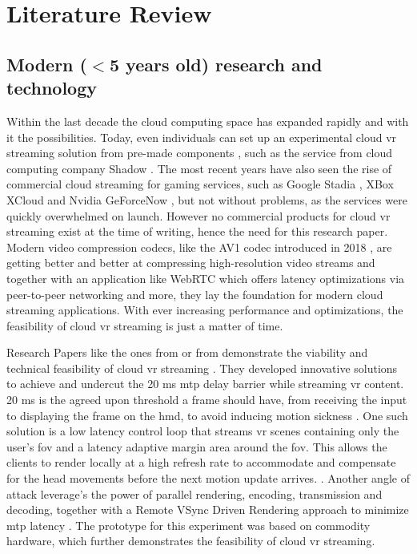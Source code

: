 \section{Literature Review}
\label{sec:lit}
\subsection{Modern ($<$5 years old) research and technology}

Within the last decade the cloud computing space has expanded rapidly and with it the possibilities. Today, even individuals can set up an experimental cloud \acrfull{vr} streaming solution from pre-made components \parencite{tayoexe}, such as the service from cloud computing company Shadow \parencite{shadow}. The most recent years have also seen the rise of commercial cloud streaming for gaming services, such as Google Stadia \parencite{stadia}, XBox XCloud \parencite{xcloud} and Nvidia GeForceNow \parencite{geforcenow}, but not without problems, as the services were quickly overwhelmed on launch. However no commercial products for cloud \acrshort{vr} streaming exist at the time of writing, hence the need for this research paper. Modern video compression codecs, like the AV1 codec introduced in 2018 \parencite{av1}, are getting better and better at compressing high-resolution video streams and together with an application like WebRTC \parencite{webRTC} which offers latency optimizations via peer-to-peer networking and more, they lay the foundation for modern cloud streaming applications. With ever increasing performance and optimizations, the feasibility of cloud \acrshort{vr} streaming is just a matter of time.

Research Papers like the ones from \cite{cutcord} or from \cite{mvr} demonstrate the viability and technical feasibility of cloud \acrshort{vr} streaming . They developed innovative solutions to achieve and undercut the 20 \acrfull{ms}  \acrfull{mtp} delay barrier while streaming \acrshort{vr} content. 20 \acrshort{ms} is the agreed upon threshold a frame should have, from receiving the input to displaying the frame on the \acrfull{hmd}, to avoid inducing motion sickness \parencite{valvevrlatency}. One such solution is a low latency control loop that streams \acrshort{vr} scenes containing only the user’s \acrfull{fov} and a latency adaptive margin area around the \acrshort{fov}. This allows the clients to render locally at a high refresh rate to accommodate and compensate for the head movements before the next motion update arrives. \parencite{mvr}. Another angle of attack  leverage's the power of parallel rendering, encoding, transmission and decoding, together with a Remote VSync Driven Rendering approach to minimize \acrshort{mtp} latency \parencite{cutcord}. The prototype for this experiment was based on commodity hardware, which further demonstrates the feasibility of cloud \acrshort{vr} streaming.

